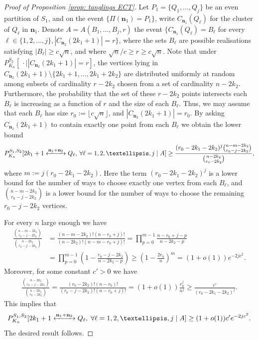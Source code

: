 \documentclass[11pt,a4paper]{article}
\theoremstyle{definition}
\numberwithin{equation}{section}
\newcommand\n{\mathbf{n}}
\newcommand{\connect}{\xleftrightarrow}
\begin{document}
\begin{proof}[Proof of Proposition \textup{\ref{prop: tanglings ECT}}]
Let $P_1=\{Q_1,\ldots, Q_j\}$ be an even partition of $S_1$, and on the event $\{\Pi(\n_1)=P_1\}$, write $C_{\n_1}(Q_\ell)$ for the cluster of $Q_\ell$ in $\n_1$. Denote $A=A(B_1,\ldots,B_j,r)$ the event $\{C_{\n_1}(Q_\ell)=B_\ell$ for every $\ell\in \{1,2,\ldots,j\}, |C_{\n_2}(2k_1+1)|=r\}$, where the sets $B_\ell$ are possible realisations satisfying $|B_\ell|\geq c\sqrt{n}$, and where $\sqrt{n}/c\geq r\geq c\sqrt{n}$. 
Note that under $P^{S_2}_{K_n}[\:\cdot \mid |C_{\n_2}(2k_1+1)|=r]$, the vertices lying in $C_{\n_2}(2k_1+1)\setminus \{2k_1+1,\ldots,2k_1+2k_2\}$ are distributed uniformly at random among subsets of cardinality $r-2k_2$ chosen from a set of cardinality $n-2k_2$. Furthermore, the probability that the set of these $r-2k_2$ points intersects each $B_\ell$ is increasing as a function of $r$ and the size of each $B_\ell$. Thus, we may assume that each $B_\ell$ has size $r_0:=\lfloor c\sqrt{n} \rfloor$, and $|C_{\n_2}(2k_1+1)|=r_0$. By asking $C_{\n_2}(2k_1+1)$ to contain exactly one point from each $B_\ell$ we obtain the lower bound
\begin{equation}
P^{S_1,S_2}_{K_n}[2k_1+1 \connect{\n_1+\n_2\:} Q_\ell, \: \forall \ell=1,2,\ldots,j \mid A]\geq \frac{(r_0-2k_1-2k_2)^j\binom{n-m-2k_2}{r_0-j-2k_2}}{\binom{n-2k_2}{r_0-2k_2}},    
\end{equation}
where $m:=j(r_0-2k_1-2k_2)$. Here the term $(r_0-2k_1-2k_2)^j$ is a lower bound for the number of ways to choose exactly one vertex from each $B_\ell$, and $\binom{n-m-2k_2}{r_0-j-2k_2}$ is a lower bound for the number of ways to choose the remaining $r_0-j-2k_2$ vertices. 

For every $n$ large enough we have
\begin{equation}
\begin{aligned}
\frac{\binom{n-m-2k_2}{r_0-j-2k_2}}{\binom{n-2k_2}{r_0-j-2k_2}}&=\frac{(n-m-2k_2)!(n-r_0+j)!}{(n-2k_2)!(n-m-r_0+j)!}=\prod_{p=0}^{m-1} \frac{n-r_0+j-p}{n-2k_2-p}\\&=\prod_{p=0}^{m-1} \left(1-\frac{r_0-j-2k_2}{n-2k_2-p}\right)
\geq \left(1-\frac{2r_0}{n}\right)^m=(1+o(1))e^{-2jc^2}.
\end{aligned}
\end{equation} 
Moreover, for some constant $c'>0$ we have
\begin{equation}
\begin{aligned}
\frac{\binom{n-2k_2}{r_0-j-2k_2}}{\binom{n-2k_2}{r_0-2k_2}}=
\frac{(r_0-2k_2)!(n-r_0)!}{(r_0-j-2k_2)!(n-r_0+j)!}
=(1+o(1))\frac{r_0^j}{n^j}\geq \frac{c'}{(r_0-2k_1-2k_2)^j}.
\end{aligned}
\end{equation}
This implies that 
\begin{equation}
P^{S_1,S_2}_{K_n}[2k_1+1 \connect{\n_1+\n_2\:} Q_\ell ,\; \forall \ell=1,2,\ldots,j \mid A]\geq (1+o(1))c' e^{-2jc^2}.   
\end{equation}
The desired result follows.
\end{proof}
\end{document}
